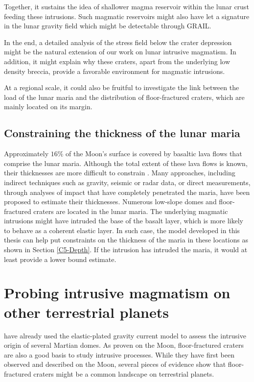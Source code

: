 Together, it sustains the idea of shallower magma reservoir within the
lunar crust  feeding these intrusions. Such  magmatic reservoirs might
also have  let a signature in  the lunar gravity field  which might be
detectable through GRAIL.

In the end,  a detailed analysis of the stress  field below the crater
depression  might  be the  natural  extension  of  our work  on  lunar
intrusive magmatism. In addition, it  might explain why these craters,
apart from  the underlying  low density  breccia, provide  a favorable
environment for magmatic intrusions.

At a regional scale, it could also be fruitful to investigate the link
between  the  load  of  the   lunar  maria  and  the  distribution  of
floor-fractured craters, which are mainly located on its margin.

\subsection{Constraining the thickness of the lunar maria}
\label{sec:thickn-lunar-maria}

Approximately $16\%$ of the Moon's surface is covered by basaltic lava
flows  that comprise  the lunar  maria. Although  the total  extent of
these lava  flows is  known, their thicknesses  are more  difficult to
constrain \citep{Thomson:2009eo}. Many  approaches, including indirect
techniques  such  as  gravity,  seismic   or  radar  data,  or  direct
measurements,  through   analyses  of  impact  that   have  completely
penetrated   the  maria,   have  been   proposed  to   estimate  their
thicknesses. Numerous low-slope domes  and floor-fractured craters are
located in the  lunar maria. The underlying  magmatic intrusions might
have intruded  the base of the  basalt layer, which is  more likely to
behave as a coherent elastic layer.  In such case, the model developed
in this thesis can help put  constraints on the thickness of the maria
in  these  locations  as  shown in  Section  \ref{C5-Depth}.   If  the
intrusion has  intruded the maria, it  would at least provide  a lower
bound estimate.

\section{Probing intrusive magmatism on other terrestrial planets}
\label{sec:other-terr-plan}

\citet{Michaut:2013dr}  have already  used the  elastic-plated gravity
current  model  to assess  the  intrusive  origin of  several  Martian
domes. As proven on the Moon,  floor-fractured craters are also a good
basis  to  study  intrusive  processes. While  they  have  first  been
observed and  described on the  Moon, several pieces of  evidence show
that  floor-fractured   craters  might   be  a  common   landscape  on
terrestrial planets.

